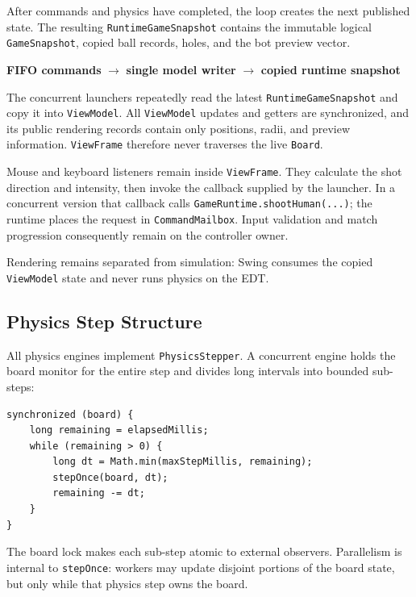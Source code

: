 After commands and physics have completed, the loop creates the next published
state. The resulting \texttt{RuntimeGameSnapshot} contains the immutable logical
\texttt{GameSnapshot}, copied ball records, holes, and the bot preview vector.

\begin{center}
\textbf{FIFO commands} $\rightarrow$ \textbf{single model writer}
$\rightarrow$ \textbf{copied runtime snapshot}
\end{center}

The concurrent launchers repeatedly read the latest
\texttt{RuntimeGameSnapshot} and copy it into \texttt{ViewModel}. All
\texttt{ViewModel} updates and getters are synchronized, and its public
rendering records contain only positions, radii, and preview information.
\texttt{ViewFrame} therefore never traverses the live \texttt{Board}.

Mouse and keyboard listeners remain inside \texttt{ViewFrame}. They calculate
the shot direction and intensity, then invoke the callback supplied by the
launcher. In a concurrent version that callback calls
\texttt{GameRuntime.shootHuman(...)}; the runtime places the request in
\texttt{CommandMailbox}. Input validation and match progression consequently
remain on the controller owner.

Rendering remains separated from simulation: Swing consumes the copied
\texttt{ViewModel} state and never runs physics on the EDT.

\subsection{Physics Step Structure}

All physics engines implement \texttt{PhysicsStepper}. A concurrent engine
holds the board monitor for the entire step and divides long intervals into
bounded sub-steps:

\begin{lstlisting}[style=codestyle,caption={Serialized board ownership and bounded sub-steps, from \texttt{model.physics.threaded.ThreadedPhysicsEngine}},label={lst:physics-step-entry}]
synchronized (board) {
    long remaining = elapsedMillis;
    while (remaining > 0) {
        long dt = Math.min(maxStepMillis, remaining);
        stepOnce(board, dt);
        remaining -= dt;
    }
}
\end{lstlisting}

The board lock makes each sub-step atomic to external observers. Parallelism is
internal to \texttt{stepOnce}: workers may update disjoint portions of the
board state, but only while that physics step owns the board.

